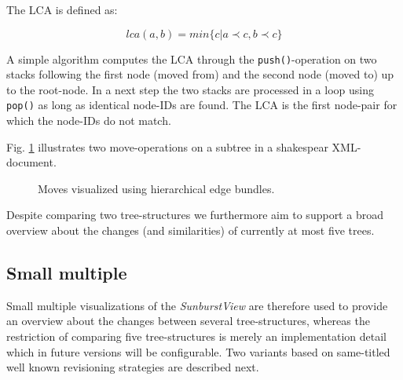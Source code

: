 The LCA is defined as:

\begin{equation}
lca(a{,} b) = min\{c|a \prec c, b \prec c\}
\end{equation}

A simple algorithm computes the LCA through the \texttt{push()}-operation on two stacks following the first node (moved from) and the second node (moved to) up to the root-node. In a next step the two stacks are processed in a loop using \texttt{pop()} as long as identical node-IDs are found. The LCA is the first node-pair for which the node-IDs do not match.

Fig. \ref{fig:moves} illustrates two move-operations on a subtree in a shakespear XML-document.

\begin{figure}[tb]
\caption{\label{fig:moves} Moves visualized using hierarchical edge bundles.}
\end{figure}

Despite comparing two tree-structures we furthermore aim to support a broad overview about the changes (and similarities) of currently at most five trees.

\subsection{Small multiple}\label{subsec::smallmultiple}
Small multiple visualizations of the \emph{SunburstView} are therefore used to provide an overview about the changes between several tree-structures, whereas the restriction of comparing five tree-structures is merely an implementation detail which in future versions will be configurable. Two variants based on same-titled well known revisioning strategies are described next.

